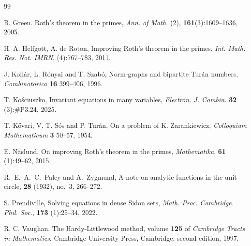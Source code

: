 \documentclass[A4paper,reqno,oneside,12pt]{amsart}
\theoremstyle{plain}
\theoremstyle{definition}
\begin{document}
\begin{thebibliography}{99}

 B. Green. Roth’s theorem in the primes, {\it{Ann. of Math.}} (2), {\bf{161}}(3):1609--1636, 2005.

 H. A. Helfgott, A. de Roton,  Improving Roth’s theorem in
the primes, {\it{Int. Math. Res. Not. IMRN}}, (4):767--783, 2011.

J. Koll\'ar, L. R\'onyai and T. Szab\'o, Norm-graphs and bipartite Turán numbers, {\it Combinatorica} {\bf 16} 399--406, 1996.

 T. Ko\'sciuszko, Invariant equations in many variables, {\it Electron. J. Combin.} {\bf {32}} (3):\#P3.24, 2025.

 T. K\H{o}vari, V. T. S\'os and P. Tur\'an, On a problem of K. Zarankiewicz, {\it{Colloquium
Mathematicum}} {\bf{3}} 50--57, 1954.

 E. Naslund, On improving Roth’s theorem in the primes, {\it{Mathematika}}, {\bf{61}} (1):49--62, 2015.

R.~E.~A.~C.~Paley and A.~Zygmund,
\newblock A note on analytic functions in the unit circle,
 {\bf 28} (1932), no.~3, 266--272.

 S. Prendiville, Solving equations in dense Sidon sets, {\it{Math. Proc. Cambridge. Phil. Soc.}}, {\bf{173}} (1):25--34, 2022. 



 R. C. Vaughan. The Hardy-Littlewood method, volume {\bf{125}} of
{\it Cambridge Tracts in Mathematics}. Cambridge University Press,
Cambridge, second edition, 1997.

\end{thebibliography}
\end{document}
